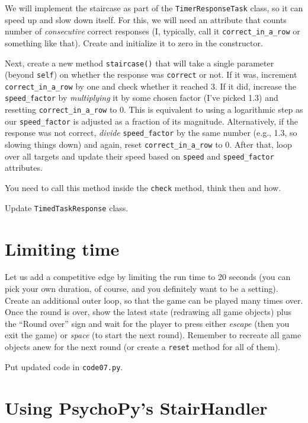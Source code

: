 \documentclass[
]{book}
\begin{document}
We will implement the staircase as part of the \texttt{TimerResponseTask} class, so it can speed up and slow down itself. For this, we will need an attribute that counts number of \emph{consecutive} correct responses (I, typically, call it \texttt{correct\_in\_a\_row} or something like that). Create and initialize it to zero in the constructor.

Next, create a new method \texttt{staircase()} that will take a single parameter (beyond \texttt{self}) on whether the response was \texttt{correct} or not. If it was, increment \texttt{correct\_in\_a\_row} by one and check whether it reached 3. If it did, increase the \texttt{speed\_factor} by \emph{multiplying} it by some chosen factor (I've picked 1.3) and resetting \texttt{correct\_in\_a\_row} to 0. This is equivalent to using a logarithmic step as our \texttt{speed\_factor} is adjusted as a fraction of its magnitude. Alternatively, if the response was not correct, \emph{divide} \texttt{speed\_factor} by the same number (e.g., 1.3, so slowing things down) and again, reset \texttt{correct\_in\_a\_row} to 0. After that, loop over all targets and update their speed based on \texttt{speed} and \texttt{speed\_factor} attributes.

You need to call this method inside the \texttt{check} method, think then and how.

Update \texttt{TimedTaskResponse} class.

\hypertarget{limiting-time}{%
\section{Limiting time}\label{limiting-time}}

Let us add a competitive edge by limiting the run time to 20 seconds (you can pick your own duration, of course, and you definitely want to be a setting). Create an additional outer loop, so that the game can be played many times over. Once the round is over, show the latest state (redrawing all game objects) plus the ``Round over'' sign and wait for the player to press either \emph{escape} (then you exit the game) or \emph{space} (to start the next round). Remember to recreate all game objects anew for the next round (or create a \texttt{reset} method for all of them).

Put updated code in \texttt{code07.py}.

\hypertarget{using-psychopys-stairhandler}{%
\section{Using PsychoPy's StairHandler}\label{using-psychopys-stairhandler}}
\end{document}
